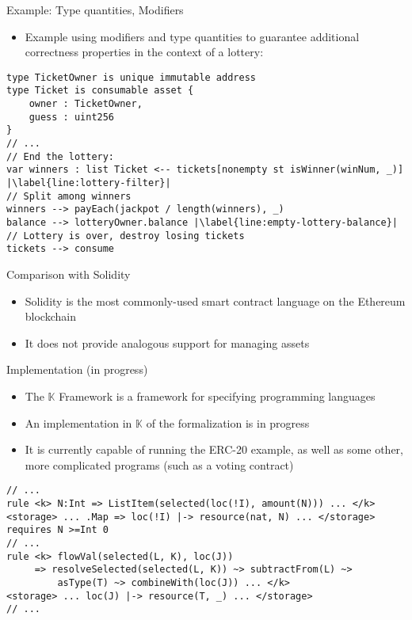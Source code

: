 \documentclass[leqno,presentation,usenames,dvipsnames]{beamer}
\begin{document}
\begin{frame}[fragile]{Example: Type quantities, Modifiers}
    \begin{itemize}
        \item Example using modifiers and type quantities to guarantee additional correctness properties in the context of a lottery:
    \end{itemize}
\begin{lstlisting}[language=flow, xleftmargin=-0.2em, basicstyle=\scriptsize\ttfamily]
type TicketOwner is unique immutable address
type Ticket is consumable asset {
    owner : TicketOwner,
    guess : uint256
}
// ...
// End the lottery:
var winners : list Ticket <-- tickets[nonempty st isWinner(winNum, _)] |\label{line:lottery-filter}|
// Split among winners
winners --> payEach(jackpot / length(winners), _)
balance --> lotteryOwner.balance |\label{line:empty-lottery-balance}|
// Lottery is over, destroy losing tickets
tickets --> consume
\end{lstlisting}
\end{frame}

\begin{frame}[fragile]{Comparison with Solidity}
    \begin{itemize}
        \item Solidity is the most commonly-used smart contract language on the Ethereum blockchain
        \item It does not provide analogous support for managing assets
    \end{itemize}



\end{frame}

\begin{frame}[fragile]{Implementation (in progress)}
    \begin{itemize}
        \item The $\mathbb{K}$ Framework is a framework for specifying programming languages
        \item An implementation in $\mathbb{K}$ of the formalization is in progress
        \item It is currently capable of running the ERC-20 example, as well as some other, more complicated programs (such as a voting contract)
    \end{itemize}

\begin{lstlisting}[xleftmargin=-0.5em, basicstyle=\scriptsize\ttfamily]
// ...
rule <k> N:Int => ListItem(selected(loc(!I), amount(N))) ... </k>
<storage> ... .Map => loc(!I) |-> resource(nat, N) ... </storage>
requires N >=Int 0
// ...
rule <k> flowVal(selected(L, K), loc(J))
     => resolveSelected(selected(L, K)) ~> subtractFrom(L) ~>
         asType(T) ~> combineWith(loc(J)) ... </k>
<storage> ... loc(J) |-> resource(T, _) ... </storage>
// ...
\end{lstlisting}
\end{frame}
\end{document}
